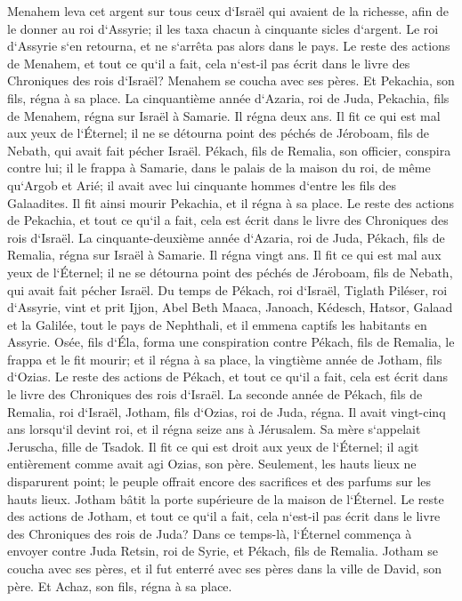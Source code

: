 \verse Menahem leva cet argent sur tous ceux d`Israël qui avaient de la richesse, afin de le donner au roi d`Assyrie; il les taxa chacun à cinquante sicles d`argent. Le roi d`Assyrie s`en retourna, et ne s`arrêta pas alors dans le pays. 
\verse Le reste des actions de Menahem, et tout ce qu`il a fait, cela n`est-il pas écrit dans le livre des Chroniques des rois d`Israël? 
\verse Menahem se coucha avec ses pères. Et Pekachia, son fils, régna à sa place. 
\verse La cinquantième année d`Azaria, roi de Juda, Pekachia, fils de Menahem, régna sur Israël à Samarie. Il régna deux ans. 
\verse Il fit ce qui est mal aux yeux de l`Éternel; il ne se détourna point des péchés de Jéroboam, fils de Nebath, qui avait fait pécher Israël. 
\verse Pékach, fils de Remalia, son officier, conspira contre lui; il le frappa à Samarie, dans le palais de la maison du roi, de même qu`Argob et Arié; il avait avec lui cinquante hommes d`entre les fils des Galaadites. Il fit ainsi mourir Pekachia, et il régna à sa place. 
\verse Le reste des actions de Pekachia, et tout ce qu`il a fait, cela est écrit dans le livre des Chroniques des rois d`Israël. 
\verse La cinquante-deuxième année d`Azaria, roi de Juda, Pékach, fils de Remalia, régna sur Israël à Samarie. Il régna vingt ans. 
\verse Il fit ce qui est mal aux yeux de l`Éternel; il ne se détourna point des péchés de Jéroboam, fils de Nebath, qui avait fait pécher Israël. 
\verse Du temps de Pékach, roi d`Israël, Tiglath Piléser, roi d`Assyrie, vint et prit Ijjon, Abel Beth Maaca, Janoach, Kédesch, Hatsor, Galaad et la Galilée, tout le pays de Nephthali, et il emmena captifs les habitants en Assyrie. 
\verse Osée, fils d`Éla, forma une conspiration contre Pékach, fils de Remalia, le frappa et le fit mourir; et il régna à sa place, la vingtième année de Jotham, fils d`Ozias. 
\verse Le reste des actions de Pékach, et tout ce qu`il a fait, cela est écrit dans le livre des Chroniques des rois d`Israël. 
\verse La seconde année de Pékach, fils de Remalia, roi d`Israël, Jotham, fils d`Ozias, roi de Juda, régna. 
\verse Il avait vingt-cinq ans lorsqu`il devint roi, et il régna seize ans à Jérusalem. Sa mère s`appelait Jeruscha, fille de Tsadok. 
\verse Il fit ce qui est droit aux yeux de l`Éternel; il agit entièrement comme avait agi Ozias, son père. 
\verse Seulement, les hauts lieux ne disparurent point; le peuple offrait encore des sacrifices et des parfums sur les hauts lieux. Jotham bâtit la porte supérieure de la maison de l`Éternel. 
\verse Le reste des actions de Jotham, et tout ce qu`il a fait, cela n`est-il pas écrit dans le livre des Chroniques des rois de Juda? 
\verse Dans ce temps-là, l`Éternel commença à envoyer contre Juda Retsin, roi de Syrie, et Pékach, fils de Remalia. 
\verse Jotham se coucha avec ses pères, et il fut enterré avec ses pères dans la ville de David, son père. Et Achaz, son fils, régna à sa place. 

